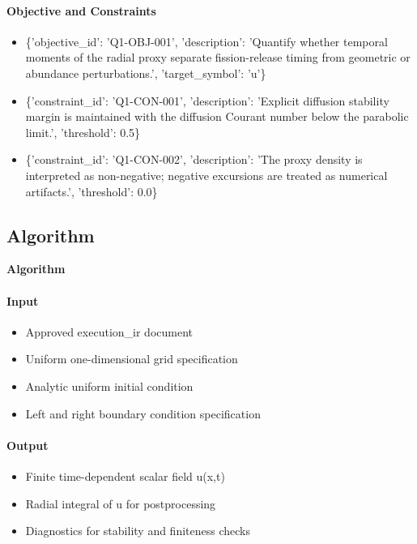 \documentclass[11pt]{article}
\begin{document}
\paragraph{Objective and Constraints}
\begin{itemize}\raggedright
\item \{'objective\_\allowbreak{}id': 'Q1-OBJ-001', 'description': 'Quantify whether temporal moments of the radial proxy separate fission-release timing from geometric or abundance perturbations.', 'target\_\allowbreak{}symbol': 'u'\}
\item \{'constraint\_\allowbreak{}id': 'Q1-CON-001', 'description': 'Explicit diffusion stability margin is maintained with the diffusion Courant number below the parabolic limit.', 'threshold': 0.5\}
\item \{'constraint\_\allowbreak{}id': 'Q1-CON-002', 'description': 'The proxy density is interpreted as non-negative; negative excursions are treated as numerical artifacts.', 'threshold': 0.0\}
\end{itemize}

\subsection{Algorithm}

\noindent\textbf{Algorithm}
\paragraph{Input}
\begin{itemize}\raggedright
\item Approved execution\_\allowbreak{}ir document
\item Uniform one-dimensional grid specification
\item Analytic uniform initial condition
\item Left and right boundary condition specification
\end{itemize}
\paragraph{Output}
\begin{itemize}\raggedright
\item Finite time-dependent scalar field u(x,t)
\item Radial integral of u for postprocessing
\item Diagnostics for stability and finiteness checks
\end{itemize}
\end{document}
